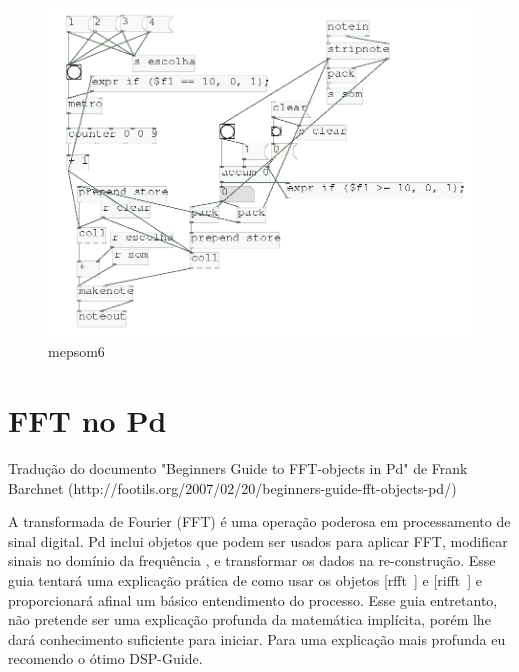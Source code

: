 \documentclass[draft]{ppgmus}
\begin{document}
\begin{figure}
\includegraphics[scale=.4]{mepsom6}
\caption{mepsom6}
\label{mepsom6}
\end{figure}



\section{FFT no Pd}
\label{sec:fftpd}

Tradução do documento "Beginners Guide to FFT-objects in Pd" de Frank Barchnet 
(http://footils.org/2007/02/20/beginners-guide-fft-objects-pd/)

A transformada de Fourier (FFT) é uma operação poderosa em processamento de sinal digital.
Pd inclui objetos que podem ser usados para aplicar FFT, modificar sinais no domínio da frequência , 
e transformar os dados na re-construção. Esse guia tentará uma explicação prática de como usar os 
objetos [rfft~] e [rifft~] e proporcionará afinal um básico entendimento do processo.
Esse guia entretanto, não pretende ser uma explicação profunda da matemática implícita, porém lhe 
dará conhecimento suficiente para iniciar. Para uma explicação mais profunda eu recomendo o ótimo  
DSP-Guide.
\end{document}
